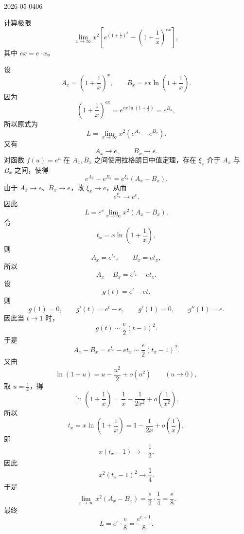 \begin{mistake}{2026-05-04}{06}

\begin{problemcontent}
计算极限
\[
\lim_{x\to\infty}x^2\left[e^{\left(1+\frac1x\right)^x}-\left(1+\frac1x\right)^{ex}\right],
\]
其中 \(ex=e\cdot x\)。
\end{problemcontent}

\begin{solutioncontent}
设
\[
A_x=\left(1+\frac1x\right)^x,\qquad B_x=ex\ln\left(1+\frac1x\right).
\]
因为
\[
\left(1+\frac1x\right)^{ex}=e^{ex\ln\left(1+\frac1x\right)}=e^{B_x},
\]
所以原式为
\[
L=\lim_{x\to\infty}x^2\left(e^{A_x}-e^{B_x}\right).
\]
又有
\[
A_x\to e,\qquad B_x\to e.
\]
对函数 \(f(u)=e^u\) 在 \(A_x,B_x\) 之间使用拉格朗日中值定理，存在 \(\xi_x\) 介于 \(A_x\) 与 \(B_x\) 之间，使得
\[
e^{A_x}-e^{B_x}=e^{\xi_x}(A_x-B_x).
\]
由于 \(A_x\to e\)、\(B_x\to e\)，故 \(\xi_x\to e\)，从而
\[
e^{\xi_x}\to e^e.
\]
因此
\[
L=e^e\lim_{x\to\infty}x^2(A_x-B_x).
\]
令
\[
t_x=x\ln\left(1+\frac1x\right),
\]
则
\[
A_x=e^{t_x},\qquad B_x=et_x,
\]
所以
\[
A_x-B_x=e^{t_x}-et_x.
\]
设
\[
g(t)=e^t-et.
\]
则
\[
g(1)=0,\qquad g'(t)=e^t-e,\qquad g'(1)=0,\qquad g''(1)=e.
\]
因此当 \(t\to 1\) 时，
\[
g(t)\sim \frac e2(t-1)^2.
\]
于是
\[
A_x-B_x=e^{t_x}-et_x\sim \frac e2(t_x-1)^2.
\]
又由
\[
\ln(1+u)=u-\frac{u^2}{2}+o(u^2)\qquad (u\to 0),
\]
取 \(u=\frac1x\)，得
\[
\ln\left(1+\frac1x\right)=\frac1x-\frac1{2x^2}+o\left(\frac1{x^2}\right).
\]
所以
\[
t_x=x\ln\left(1+\frac1x\right)=1-\frac1{2x}+o\left(\frac1x\right),
\]
即
\[
x(t_x-1)\to -\frac12.
\]
因此
\[
x^2(t_x-1)^2\to \frac14.
\]
于是
\[
\lim_{x\to\infty}x^2(A_x-B_x)=\frac e2\cdot\frac14=\frac e8.
\]
最终
\[
L=e^e\cdot\frac e8=\frac{e^{e+1}}8.
\]
\end{solutioncontent}


\end{mistake}
